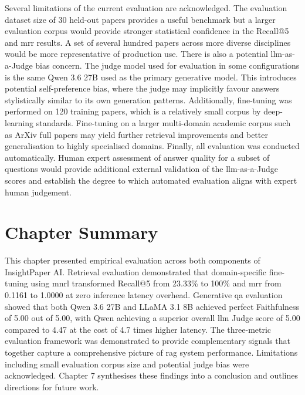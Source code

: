 Several limitations of the current evaluation are acknowledged.
\newline \newline The evaluation dataset size of 30 held-out papers provides a useful benchmark but a larger evaluation corpus would provide stronger statistical confidence in the Recall@5 and \gls{mrr} results. A set of several hundred papers across more diverse disciplines would be more representative of production use.
\newline \newline There is also a potential \gls{llm}-as-a-Judge bias concern. The judge model used for evaluation in some configurations is the same Qwen 3.6 27B used as the primary generative model. This introduces potential self-preference bias, where the judge may implicitly favour answers stylistically similar to its own generation patterns.
\newline \newline Additionally, fine-tuning was performed on 120 training papers, which is a relatively small corpus by deep-learning standards. Fine-tuning on a larger multi-domain academic corpus such as ArXiv full papers may yield further retrieval improvements and better generalisation to highly specialised domains.
\newline \newline Finally, all evaluation was conducted automatically. Human expert assessment of answer quality for a subset of questions would provide additional external validation of the \gls{llm}-as-a-Judge scores and establish the degree to which automated evaluation aligns with expert human judgement.

\section{Chapter Summary}

This chapter presented empirical evaluation across both components of InsightPaper AI. Retrieval evaluation demonstrated that domain-specific fine-tuning using \gls{mnrl} transformed Recall@5 from 23.33\% to 100\% and \gls{mrr} from 0.1161 to 1.0000 at zero inference latency overhead. Generative \gls{qa} evaluation showed that both Qwen 3.6 27B and LLaMA 3.1 8B achieved perfect Faithfulness of 5.00 out of 5.00, with Qwen achieving a superior overall \gls{llm} Judge score of 5.00 compared to 4.47 at the cost of 4.7 times higher latency. The three-metric evaluation framework was demonstrated to provide complementary signals that together capture a comprehensive picture of \gls{rag} system performance. Limitations including small evaluation corpus size and potential judge bias were acknowledged. Chapter 7 synthesises these findings into a conclusion and outlines directions for future work.

